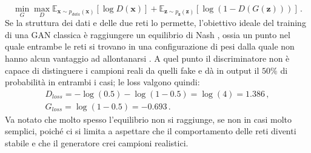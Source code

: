 \documentclass[Lau, noexaminfo, oneside]{sapthesis} %
\begin{document}
\begin{equation}
\min _{G}\max _{D}\mathbb {E} _{{\boldsymbol {x}}\sim p_{data}({\boldsymbol {x}})}[\log D({\boldsymbol {x}})]+\mathbb {E} _{{\boldsymbol {z}}\sim p_{\boldsymbol {z}}({\boldsymbol {z}})}[\log(1-D(G({\boldsymbol {z}})))] \,.
\end{equation}
Se la struttura dei dati e delle due reti lo permette, l'obiettivo ideale del training di una GAN classica è raggiungere un equilibrio di Nash
\cite{Nash48}, ossia un punto nel quale entrambe le reti si trovano in una configurazione di pesi dalla quale non hanno alcun vantaggio ad allontanarsi . A quel punto il discriminatore non è capace di distinguere i campioni reali da quelli fake e dà in output il $50\%$ di probabilità in entrambi i casi; le loss valgono quindi:
\begin{align}
D_{loss} = - \log(0.5) - \log(1 - 0.5) = \log(4) = 1.386 \,,\\
G_{loss} = \log(1- 0.5) = - 0.693 \,.
\end{align}
Va notato che molto spesso l'equilibrio non si raggiunge, se non in casi molto semplici, poiché ci si limita a aspettare che il comportamento delle reti diventi stabile e che il generatore crei campioni realistici.
\end{document}
